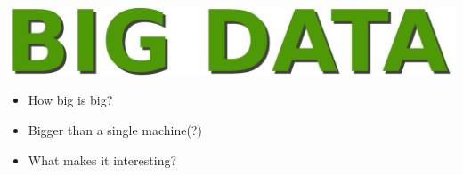 
\begin{frame}
\begin{center}
\includegraphics[width=1\textwidth]{graphics/big-data1.pdf}

\bigskip
\bigskip

\begin{itemize}
	\item<2-> How big is big?
	\item<3-> Bigger than a single machine(?)
	\item<4-> What makes it interesting?
\end{itemize}

\end{center}
\end{frame}


